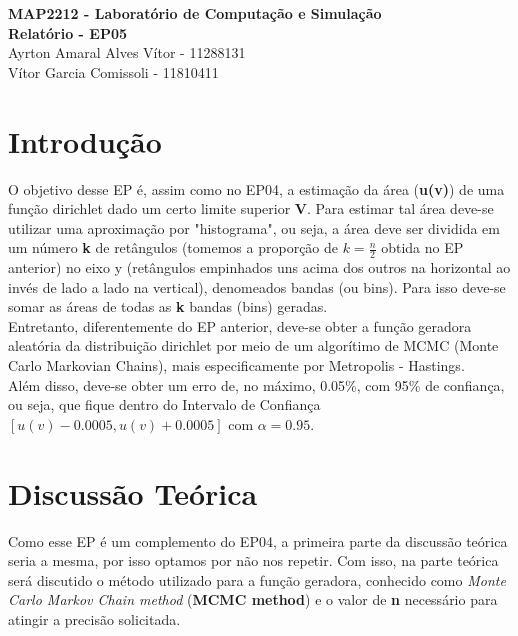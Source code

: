\documentclass{article}
\begin{document}
\begin{center}
    \textbf{\LARGE MAP2212 - Laboratório de Computação e Simulação}\\
    \vspace{0.3cm}
    \textbf{\Large Relatório - EP05}\\
    \vspace{0.3cm}
    \large{Ayrton Amaral Alves Vítor - 11288131}\\
    \large{Vítor Garcia Comissoli - 11810411}
\end{center}

\section{Introdução}

    O objetivo desse EP é, assim como no EP04, a estimação da área (\textbf{u(v)}) de uma função dirichlet dado um certo limite superior \textbf{V}. Para estimar tal área deve-se utilizar uma aproximação por "histograma", ou seja, a área deve ser dividida em um número \textbf{k} de retângulos (tomemos a proporção de $k = \frac{n}{2}$ obtida no EP anterior) no eixo y (retângulos empinhados uns acima dos outros na horizontal ao invés de lado a lado na vertical), denomeados bandas (ou bins). Para isso deve-se somar as áreas de todas as \textbf{k} bandas (bins) geradas.\\
    
    Entretanto, diferentemente do EP anterior, deve-se obter a função geradora aleatória da distribuição dirichlet por meio de um algorítimo de MCMC (Monte Carlo Markovian Chains), mais especificamente por Metropolis - Hastings.\\
    
    Além disso, deve-se obter um erro de, no máximo, 0.05\%, com 95\% de confiança, ou seja, que fique dentro do Intervalo de Confiança $[u(v) - 0.0005, u(v) + 0.0005]$ com $\alpha=0.95$.
    
\section{Discussão Teórica}

    Como esse EP é um complemento do EP04, a primeira parte da discussão teórica  seria a mesma, por isso optamos por não nos repetir. Com isso, na parte teórica será discutido o método utilizado para a função geradora, conhecido como \textit{Monte Carlo Markov Chain method} (\textbf{MCMC method}) e o valor de \textbf{n} necessário para atingir a precisão solicitada.
    
\end{document}
